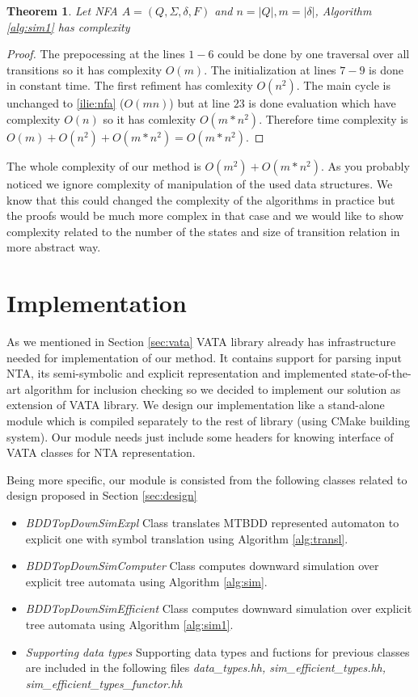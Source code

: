 \documentclass[a4paper, 12pt]{article}
\newtheorem{theorem}{Theorem}
\begin{document}
\begin{theorem}
	Let NFA $A=(Q,\Sigma,\delta, F)$ and $n=|Q|, m=|\delta|$, Algorithm \ref{alg:sim1} has complexity 
\end{theorem}
\begin{proof}
	The prepocessing at the lines $1-6$ could be done by one traversal over all transitions so it has complexity $O(m)$.
	The initialization at lines $7-9$ is done in constant time.
	The first refiment has comlexity $O(n^2)$.
	The main cycle is unchanged to \ref{ilie:nfa} ($O(mn)$) but at line $23$ is done evaluation which have complexity $O(n)$ so it
	has comlexity $O(m*n^2)$.
	Therefore time complexity is $O(m) + O(n^2) + O(m*n^2) = O(m*n^2)$.
\end{proof}

The whole complexity of our method is $O(m^2)+O(m*n^2)$.
As you probably noticed we ignore complexity of manipulation of the used data structures.
We know that this could changed the complexity of the algorithms in practice but the proofs would be much more complex in that case
and we would like to show complexity related to the number of the states and size of transition relation in more abstract way.

\section{Implementation}
\label{sec:impl}

As we mentioned in Section \ref{sec:vata} VATA library already has infrastructure needed for implementation of
our method.
It contains support for parsing input NTA, its semi-symbolic and explicit representation and implemented
state-of-the-art algorithm for inclusion checking so we decided to implement our solution as extension of VATA library.
We design our implementation like a stand-alone module which is compiled separately to the rest of library (using CMake building system).
Our module needs just include some headers for knowing interface of VATA classes for NTA representation.

Being more specific, our module is consisted from the following classes related to design proposed in Section \ref{sec:design}
\begin{itemize}
	\item \emph{BDDTopDownSimExpl} Class translates MTBDD represented automaton to explicit one with symbol translation using Algorithm \ref{alg:transl}.
	\item \emph{BDDTopDownSimComputer} Class computes downward simulation over explicit tree automata using Algorithm \ref{alg:sim}.
	\item \emph{BDDTopDownSimEfficient} Class computes downward simulation over explicit tree automata using Algorithm \ref{alg:sim1}.
	\item \emph{Supporting data types} Supporting data types and fuctions for previous classes are included in the following files \emph{data\_types.hh, sim\_efficient\_types.hh, sim\_efficient\_types\_functor.hh}
\end{itemize}
\end{document}
